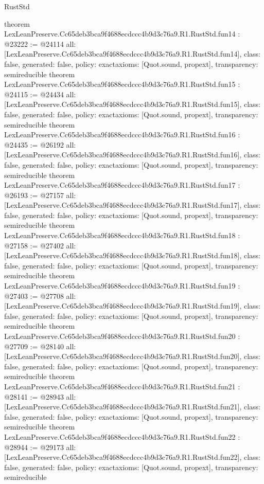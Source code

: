 \begin{lexlean}{RustStd}
\begin{coremodule}
{}
theorem LexLeanPreserve.Cc65deb3bca9f4688ecdccc4b9d3c76a9.R1.RustStd.fun14 : @23222 := @24114 {
  all: [LexLeanPreserve.Cc65deb3bca9f4688ecdccc4b9d3c76a9.R1.RustStd.fun14],
  class: false,
  generated: false,
  policy: exact{axioms: [Quot.sound, propext]},
  transparency: semireducible
}
theorem LexLeanPreserve.Cc65deb3bca9f4688ecdccc4b9d3c76a9.R1.RustStd.fun15 : @24115 := @24434 {
  all: [LexLeanPreserve.Cc65deb3bca9f4688ecdccc4b9d3c76a9.R1.RustStd.fun15],
  class: false,
  generated: false,
  policy: exact{axioms: [Quot.sound, propext]},
  transparency: semireducible
}
theorem LexLeanPreserve.Cc65deb3bca9f4688ecdccc4b9d3c76a9.R1.RustStd.fun16 : @24435 := @26192 {
  all: [LexLeanPreserve.Cc65deb3bca9f4688ecdccc4b9d3c76a9.R1.RustStd.fun16],
  class: false,
  generated: false,
  policy: exact{axioms: [Quot.sound, propext]},
  transparency: semireducible
}
theorem LexLeanPreserve.Cc65deb3bca9f4688ecdccc4b9d3c76a9.R1.RustStd.fun17 : @26193 := @27157 {
  all: [LexLeanPreserve.Cc65deb3bca9f4688ecdccc4b9d3c76a9.R1.RustStd.fun17],
  class: false,
  generated: false,
  policy: exact{axioms: [Quot.sound, propext]},
  transparency: semireducible
}
theorem LexLeanPreserve.Cc65deb3bca9f4688ecdccc4b9d3c76a9.R1.RustStd.fun18 : @27158 := @27402 {
  all: [LexLeanPreserve.Cc65deb3bca9f4688ecdccc4b9d3c76a9.R1.RustStd.fun18],
  class: false,
  generated: false,
  policy: exact{axioms: [Quot.sound, propext]},
  transparency: semireducible
}
theorem LexLeanPreserve.Cc65deb3bca9f4688ecdccc4b9d3c76a9.R1.RustStd.fun19 : @27403 := @27708 {
  all: [LexLeanPreserve.Cc65deb3bca9f4688ecdccc4b9d3c76a9.R1.RustStd.fun19],
  class: false,
  generated: false,
  policy: exact{axioms: [Quot.sound, propext]},
  transparency: semireducible
}
theorem LexLeanPreserve.Cc65deb3bca9f4688ecdccc4b9d3c76a9.R1.RustStd.fun20 : @27709 := @28140 {
  all: [LexLeanPreserve.Cc65deb3bca9f4688ecdccc4b9d3c76a9.R1.RustStd.fun20],
  class: false,
  generated: false,
  policy: exact{axioms: [Quot.sound, propext]},
  transparency: semireducible
}
theorem LexLeanPreserve.Cc65deb3bca9f4688ecdccc4b9d3c76a9.R1.RustStd.fun21 : @28141 := @28943 {
  all: [LexLeanPreserve.Cc65deb3bca9f4688ecdccc4b9d3c76a9.R1.RustStd.fun21],
  class: false,
  generated: false,
  policy: exact{axioms: [Quot.sound, propext]},
  transparency: semireducible
}
theorem LexLeanPreserve.Cc65deb3bca9f4688ecdccc4b9d3c76a9.R1.RustStd.fun22 : @28944 := @29173 {
  all: [LexLeanPreserve.Cc65deb3bca9f4688ecdccc4b9d3c76a9.R1.RustStd.fun22],
  class: false,
  generated: false,
  policy: exact{axioms: [Quot.sound, propext]},
  transparency: semireducible
}
\end{coremodule}
\end{lexlean}
